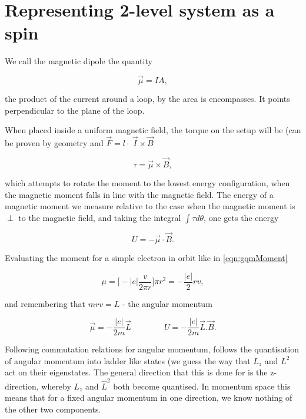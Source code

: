\section{Representing 2-level system as a spin}
\label{spin12}
We call the magnetic dipole the quantity

\begin{equation}\label{eqn:gqmMoment}
  \vec{\mu} = IA,
\end{equation}

\noindent  the product  of the  current around  a loop,  by the  area is
encompasses. It points perpendicular to the plane of the loop.

When placed  inside a uniform  magnetic field,  the torque on  the setup
will      be      (can      be     proven      by      geometry      and
$\vec{F} = l\cdot\ \vec{I}\times \vec{B}$

  \begin{equation}
    \tau = \vec{\mu}\times\vec{B},
  \end{equation}

  \noindent which  attempts to  rotate the moment  to the  lowest energy
  configuration,  when  the  magnetic  moment falls  in  line  with  the
  magnetic field. The energy of a magnetic moment we measure relative to
  the case  when the magnetic moment  is $\perp$ to the  magnetic field,
  and taking the integral $\int\tau d\theta$, one gets the energy

  \begin{equation}
    U = -\vec{\mu} \cdot \vec{B}.
  \end{equation}

  \noindent Evaluating the moment for a simple electron in orbit like in
  \autoref{eqn:gqmMoment}

  \begin{equation}
    \mu = \big[-|e|\frac{v}{2\pi r}\big]\pi r^2 = -\frac{|e|}{2}rv,
  \end{equation}

  \noindent and remembering that $mrv = L$ - the angular momentum

  \begin{equation}
    \vec{\mu}= -\frac{|e|}{2m}\vec{L} \qquad \qquad U = -\frac{|e|}{2m}\vec{L}.\vec{B}.
  \end{equation}

  \noindent  Following  commutation   relations  for  angular  momentum,
  follows the quantisation  of angular momentum into  ladder like states
  (we guess the  way that $L_z$ and $L^2$ act  on their eigenstates. The
  general direction  that this is  done for is the  z-direction, whereby
  $L_z$ and  $\hat{L}^2$ both become  quantised. In momentum  space this
  means that  for a  fixed angular  momentum in  one direction,  we know
  nothing of the other two components.

